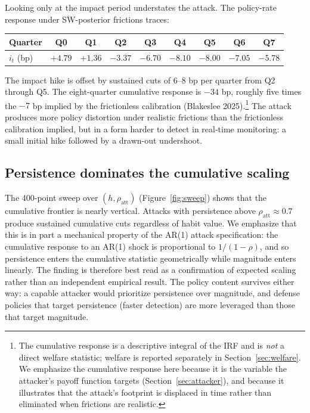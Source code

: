 \documentclass[12pt]{article}
\begin{document}
Looking only at the impact period understates the attack. The policy-rate response under SW-posterior frictions traces:
\begin{center}
\small
\begin{tabular}{lcccccccc}
\toprule
Quarter & Q0 & Q1 & Q2 & Q3 & Q4 & Q5 & Q6 & Q7 \\
\midrule
\(i_t\) (bp) & \(+4.79\) & \(+1.36\) & \(-3.37\) & \(-6.70\) & \(-8.10\) & \(-8.00\) & \(-7.05\) & \(-5.78\) \\
\bottomrule
\end{tabular}
\end{center}
The impact hike is offset by sustained cuts of 6--8 bp per quarter from Q2 through Q5. The eight-quarter cumulative response is \(-34\) bp, roughly five times the \(-7\) bp implied by the frictionless calibration (Blakeslee 2025).\footnote{The cumulative response is a descriptive integral of the IRF and is \emph{not} a direct welfare statistic; welfare is reported separately in Section~\ref{sec:welfare}. We emphasize the cumulative response here because it is the variable the attacker's payoff function targets (Section~\ref{sec:attacker}), and because it illustrates that the attack's footprint is displaced in time rather than eliminated when frictions are realistic.} The attack produces more policy distortion under realistic frictions than the frictionless calibration implied, but in a form harder to detect in real-time monitoring: a small initial hike followed by a drawn-out undershoot.

\subsection{Persistence dominates the cumulative scaling}

The 400-point sweep over \((h, \rho_{\text{att}})\) (Figure~\ref{fig:sweep}) shows that the cumulative frontier is nearly vertical. Attacks with persistence above \(\rho_{\text{att}} \approx 0.7\) produce sustained cumulative cuts regardless of habit value. We emphasize that this is in part a mechanical property of the AR(1) attack specification: the cumulative response to an AR(1) shock is proportional to \(1/(1 - \rho)\), and so persistence enters the cumulative statistic geometrically while magnitude enters linearly. The finding is therefore best read as a confirmation of expected scaling rather than an independent empirical result. The policy content survives either way: a capable attacker would prioritize persistence over magnitude, and defense policies that target persistence (faster detection) are more leveraged than those that target magnitude.
\end{document}
